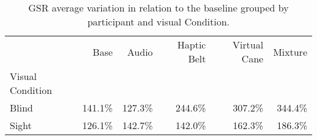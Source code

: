 
\begin{table}[!htb]
\centering
\caption{GSR average variation in relation to the baseline grouped by participant and visual Condition.}
\label{tab:gsr_var_average_group}
\begin{tabular}{lrrrrr}
\toprule
{} &     Base &    Audio & Haptic Belt & Virtual Cane &  Mixture \\
Visual Condition &          &          &             &              &          \\
\midrule
Blind            &  141.1\% &  127.3\% &     244.6\% &      307.2\% &  344.4\% \\
Sight            &  126.1\% &  142.7\% &     142.0\% &      162.3\% &  186.3\% \\
\bottomrule
\end{tabular}
\end{table}

